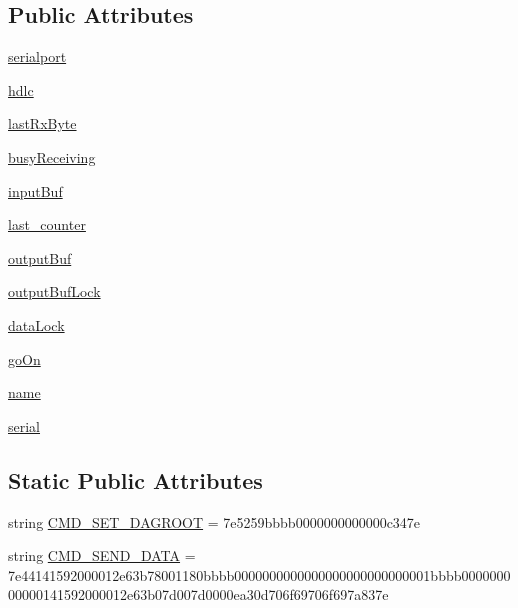 \subsection*{Public Attributes}
\begin{DoxyCompactItemize}
\item 
\hyperlink{classuinject__dagroot_1_1mote_probe_a14b163224b5fac9aa1c93aac7b212256}{serialport}
\item 
\hyperlink{classuinject__dagroot_1_1mote_probe_a99700c94737feb39a3fec068e8675a49}{hdlc}
\item 
\hyperlink{classuinject__dagroot_1_1mote_probe_ae50ab03320cdd296a2e4c48eb37ea9db}{last\+Rx\+Byte}
\item 
\hyperlink{classuinject__dagroot_1_1mote_probe_a6ca22ae4abb61f6fae8165e766105b3c}{busy\+Receiving}
\item 
\hyperlink{classuinject__dagroot_1_1mote_probe_ac5ce9eaf64817ecd7bbacb5f1825a3d9}{input\+Buf}
\item 
\hyperlink{classuinject__dagroot_1_1mote_probe_afa202c7a1bfeb251a1a2ce5f76f180b3}{last\+\_\+counter}
\item 
\hyperlink{classuinject__dagroot_1_1mote_probe_ae2295c6bba938fcd06a87d5528f04180}{output\+Buf}
\item 
\hyperlink{classuinject__dagroot_1_1mote_probe_a57ec5bfce48e23bf2b5819ba014579e0}{output\+Buf\+Lock}
\item 
\hyperlink{classuinject__dagroot_1_1mote_probe_abf921c7d25ef8615699451f39745c446}{data\+Lock}
\item 
\hyperlink{classuinject__dagroot_1_1mote_probe_abb58a28a211f36327d1d5db897f50f94}{go\+On}
\item 
\hyperlink{classuinject__dagroot_1_1mote_probe_a54bc30c9c4c561b1adc14912f3157c38}{name}
\item 
\hyperlink{classuinject__dagroot_1_1mote_probe_a838b6c69754953c0941805c5ae00a1af}{serial}
\end{DoxyCompactItemize}
\subsection*{Static Public Attributes}
\begin{DoxyCompactItemize}
\item 
string \hyperlink{classuinject__dagroot_1_1mote_probe_a0c57db8232342abd02c69898e5fa3596}{C\+M\+D\+\_\+\+S\+E\+T\+\_\+\+D\+A\+G\+R\+O\+OT} = \textquotesingle{}7e5259bbbb0000000000000c347e\textquotesingle{}
\item 
string \hyperlink{classuinject__dagroot_1_1mote_probe_aef623eae15fcc0a3937e35e8c6ddf4bf}{C\+M\+D\+\_\+\+S\+E\+N\+D\+\_\+\+D\+A\+TA} = \textquotesingle{}7e44141592000012e63b78001180bbbb0000000000000000000000000001bbbb000000000000141592000012e63b07d007d0000ea30d706f69706f697a837e\textquotesingle{}
\end{DoxyCompactItemize}


